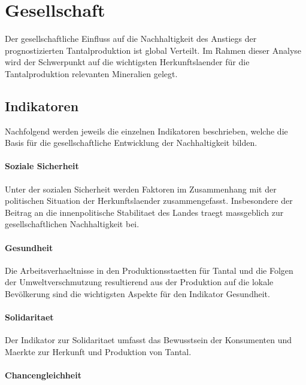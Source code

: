 \section{Gesellschaft}\label{sec:society}

Der gesellschaftliche Einfluss auf die Nachhaltigkeit des Anstiegs der
prognostizierten Tantalproduktion ist global Verteilt. Im Rahmen dieser Analyse
wird der Schwerpunkt auf die wichtigsten Herkunftslaender für die
Tantalproduktion relevanten Mineralien gelegt.


\subsection{Indikatoren}

Nachfolgend werden jeweils die einzelnen Indikatoren beschrieben, welche die
Basis für die gesellschaftliche Entwicklung der Nachhaltigkeit bilden.

\paragraph{Soziale Sicherheit}

Unter der sozialen Sicherheit werden Faktoren im Zusammenhang mit der
politischen Situation der Herkunftslaender zusammengefasst. Insbesondere der
Beitrag an die innenpolitische Stabilitaet des Landes traegt massgeblich zur
gesellschaftlichen Nachhaltigkeit bei.

\paragraph{Gesundheit}

Die Arbeitsverhaeltnisse in den Produktionsstaetten für Tantal und die Folgen
der Umweltverschmutzung resultierend aus der Produktion auf die lokale
Bevölkerung sind die wichtigsten Aspekte für den Indikator Gesundheit.

\paragraph{Solidaritaet}

Der Indikator zur Solidaritaet umfasst das Bewusstsein der Konsumenten und
Maerkte zur Herkunft und Produktion von Tantal.

\paragraph{Chancengleichheit}

